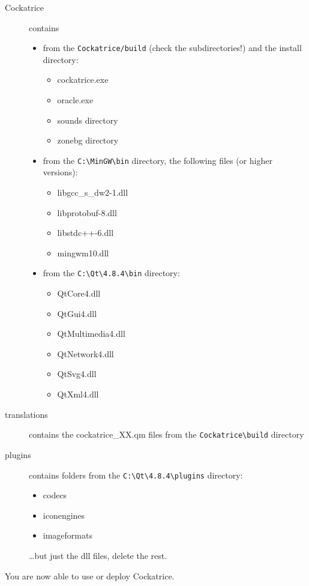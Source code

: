 \documentclass[a4paper]{scrbook}
\newcommand{\shellcmd}[1]{\texttt{\scriptsize #1}}
\begin{document}
\begin{description}
 \item[Cockatrice] contains
    \begin{itemize}
     \item from the \shellcmd{Cockatrice/build} (check the subdirectories!) and the install directory:
	\begin{itemize}
	 \item cockatrice.exe
	 \item oracle.exe
	 \item sounds directory
	 \item zonebg directory 
	\end{itemize}
     \item from the \shellcmd{C:\textbackslash MinGW\textbackslash bin} directory, the following files (or higher versions):
	\begin{itemize}
	 \item libgcc\_s\_dw2-1.dll
	 \item libprotobuf-8.dll
	 \item libstdc++-6.dll
	 \item mingwm10.dll
	\end{itemize}
     \item from the \shellcmd{C:\textbackslash Qt\textbackslash 4.8.4\textbackslash bin} directory:
	\begin{itemize}
	 \item QtCore4.dll
	 \item QtGui4.dll
	 \item QtMultimedia4.dll
	 \item QtNetwork4.dll
	 \item QtSvg4.dll
	 \item QtXml4.dll
	\end{itemize}
    \end{itemize}
 \item[translations] contains the cockatrice\_XX.qm files from the \shellcmd{Cockatrice\textbackslash build} directory
 \item[plugins] contains folders from the \shellcmd{C:\textbackslash Qt\textbackslash 4.8.4\textbackslash plugins} directory:
    \begin{itemize}
     \item codecs
     \item iconengines
     \item imageformats
    \end{itemize}
    \dots but just the dll files, delete the rest.
\end{description}
You are now able to use or deploy Cockatrice.
\end{document}
